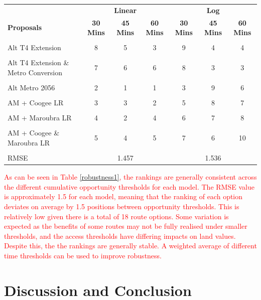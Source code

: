 \documentclass[preprint,12pt,authoryear]{elsarticle}
\begin{document}
\begin{table}[H]
\centering
\footnotesize 


\begin{tabular}{p{3cm}ccc|ccc}
    \toprule

    & \multicolumn{3}{c}{\textbf{Linear}}& \multicolumn{3}{c}{\textbf{Log}}\\
 \textbf{Proposals}& \textbf{30 Mins }& \textbf{45 Mins}& \textbf{60 Mins}& \textbf{30 Mins}& \textbf{45 Mins}&\textbf{60 Mins}\\
    \midrule
 & & & & & & \\
 Alt T4 Extension& 8& 5& 3& 9& 4&4\\
 & & & & & &\\
 Alt T4 Extension \& Metro Conversion& 7& 6& 6& 8& 3&3\\
 & & & & & &\\
 Alt Metro 2056& 2& 1& 1& 3& 9&6\\
 & & & & & &\\
 AM + Coogee LR& 3& 3& 2& 5& 8&7\\
 & & & & & &\\
 AM + Maroubra LR& 4& 2& 4& 6& 7&8\\
 & & & & & &\\
 AM + Coogee \& Maroubra LR& 5& 4& 5& 7& 6&10\\
 & & & & & &\\
 \midrule
RMSE & \multicolumn{3}{c}{1.457}& \multicolumn{3}{c}{1.536}\\
 \bottomrule
\end{tabular}
\end{table}


\textcolor{red}{As can be seen in Table \ref{robustness1}, the rankings are generally consistent across the different cumulative opportunity thresholds for each model. The RMSE value is approximately 1.5 for each model, meaning that the ranking of each option deviates on average by 1.5 positions between opportunity thresholds. This is relatively low given there is a total of 18 route options. Some variation is expected as the benefits of some routes may not be fully realised under smaller thresholds, and the access thresholds have differing impacts on land values. Despite this, the the rankings are generally stable. A weighted average of different time thresholds can be used to improve robustness.}





\section{Discussion and Conclusion}
\label{sec:discussion}
\end{document}
